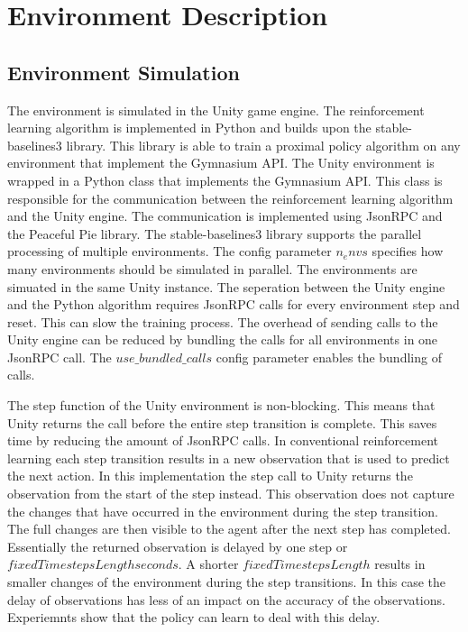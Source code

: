\section{Environment Description}
\label{cha:env_description}

\subsection{Environment Simulation}
\label{sec:env_simulation}

The environment is simulated in the Unity game engine. The reinforcement learning algorithm is implemented in Python and builds upon the stable-baselines3 library. This library is able to train a proximal policy algorithm on any environment that implement the Gymnasium API. The Unity environment is wrapped in a Python class that implements the Gymnasium API. This class is responsible for the communication between the reinforcement learning algorithm and the Unity engine. The communication is implemented using JsonRPC and the Peaceful Pie \autocite{peacefulpie} library. 
The stable-baselines3 library supports the parallel processing of multiple environments. The config parameter $n_envs$ specifies how many environments should be simulated in parallel. The environments are simuated in the same Unity instance. The seperation between the Unity engine and the Python algorithm requires JsonRPC calls for every environment step and reset. This can slow the training process. The overhead of sending calls to the Unity engine can be reduced by bundling the calls for all environments in one JsonRPC call. The $use\_bundled\_calls$ config parameter enables the bundling of calls.

The step function of the Unity environment is non-blocking. This means that Unity returns the call before the entire step transition is complete. This saves time by reducing the amount of JsonRPC calls. In conventional reinforcement learning each step transition results in a new observation that is used to predict the next action. In this implementation the step call to Unity returns the observation from the start of the step instead. This observation does not capture the changes that have occurred in the environment during the step transition. The full changes are then visible to the agent after the next step has completed. Essentially the returned observation is delayed by one step or $fixedTimestepsLength seconds$. A shorter $fixedTimestepsLength$ results in smaller changes of the environment during the step transitions. In this case the delay of observations has less of an impact on the accuracy of the observations.
Experiemnts show that the policy can learn to deal with this delay.

